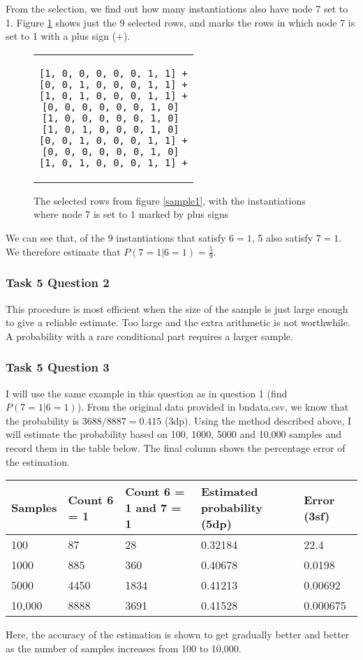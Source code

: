 \documentclass[a4paper,11pt]{article}
\begin{document}
From the selection, we find out how many instantiations also have node 7 set to 1. Figure \ref{sample2} shows just the 9 selected rows, and marks the rows in which node 7 is set to 1 with a plus sign (+).

\begin{figure}[h]
	\centering
	\lstset{basicstyle=\ttfamily}
	\begin{tabular}{c}
	\begin{lstlisting}
[1, 0, 0, 0, 0, 0, 1, 1] +
[0, 0, 1, 0, 0, 0, 1, 1] +
[1, 0, 1, 0, 0, 0, 1, 1] +
[0, 0, 0, 0, 0, 0, 1, 0] 
[1, 0, 0, 0, 0, 0, 1, 0] 
[1, 0, 1, 0, 0, 0, 1, 0] 
[0, 0, 1, 0, 0, 0, 1, 1] +
[0, 0, 0, 0, 0, 0, 1, 0] 
[1, 0, 1, 0, 0, 0, 1, 1] +
	\end{lstlisting}
	\end{tabular}
	\caption{The selected rows from figure \ref{sample1}, with the instantiations where node 7 is set to 1 marked by plus signs}
	\label{sample2}
\end{figure}

We can see that, of the 9 instantiations that satisfy $6=1$, 5 also satisfy $7=1$.  We therefore estimate that $P(7=1|6=1) = \frac{5}{9}$.

\subsubsection{Task 5 Question 2}

This procedure is most efficient when the size of the sample is just large enough to give a reliable estimate.  Too large and the extra arithmetic is not worthwhile.  A probability with a rare conditional part requires a larger sample.

\subsubsection{Task 5 Question 3}

I will use the same example in this question as in question 1 (find $P(7=1|6=1)$).  From the original data provided in bndata.csv, we know that the probability is $3688 / 8887 = 0.415$ (3dp).  Using the method described above, I will estimate the probability based on 100, 1000, 5000 and 10,000 samples and record them in the table below.  The final column shows the percentage error of the estimation.

\begin{tabular}{l l l l l}
	Samples		& Count 6 = 1	& Count 6 = 1 and 7 = 1	& Estimated probability (5dp)		& Error (3sf) \\
	\hline
	100		& 87	& 28	& 0.32184		& 22.4 \\
	1000	& 885	& 360	& 0.40678		& 0.0198 \\
	5000	& 4450	& 1834	& 0.41213		& 0.00692 \\
	10,000	& 8888	& 3691	& 0.41528		& 0.000675
\end{tabular}

Here, the accuracy of the estimation is shown to get gradually better and better as the number of samples increases from 100 to 10,000.
\end{document}
